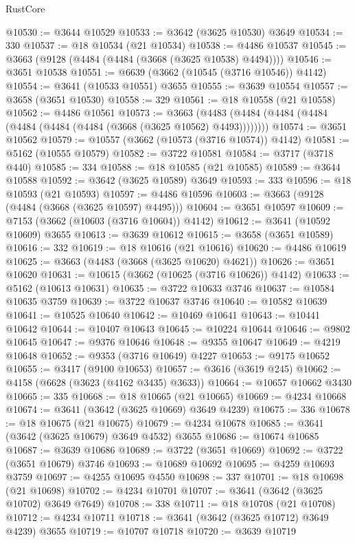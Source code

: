 \begin{lexlean}{RustCore}
\begin{coremodule}
@10530 := @3644 @10529
@10533 := @3642 (@3625 @10530) @3649
@10534 := 330
@10537 := @18 @10534 (@21 @10534)
@10538 := @4486 @10537
@10545 := @3663 (@9128 (@4484 (@4484 (@3668 (@3625 @10538) @4494))))
@10546 := @3651 @10538
@10551 := @6639 (@3662 (@10545 (@3716 @10546)) @4142)
@10554 := @3641 (@10533 @10551) @3655
@10555 := @3639 @10554
@10557 := @3658 (@3651 @10530)
@10558 := 329
@10561 := @18 @10558 (@21 @10558)
@10562 := @4486 @10561
@10573 := @3663 (@4483 (@4484 (@4484 (@4484 (@4484 (@4484 (@4484 (@3668 (@3625 @10562) @4493))))))))
@10574 := @3651 @10562
@10579 := @10557 (@3662 (@10573 (@3716 @10574)) @4142)
@10581 := @5162 (@10555 @10579)
@10582 := @3722 @10581
@10584 := @3717 (@3718 @440)
@10585 := 334
@10588 := @18 @10585 (@21 @10585)
@10589 := @3644 @10588
@10592 := @3642 (@3625 @10589) @3649
@10593 := 333
@10596 := @18 @10593 (@21 @10593)
@10597 := @4486 @10596
@10603 := @3663 (@9128 (@4484 (@3668 (@3625 @10597) @4495)))
@10604 := @3651 @10597
@10609 := @7153 (@3662 (@10603 (@3716 @10604)) @4142)
@10612 := @3641 (@10592 @10609) @3655
@10613 := @3639 @10612
@10615 := @3658 (@3651 @10589)
@10616 := 332
@10619 := @18 @10616 (@21 @10616)
@10620 := @4486 @10619
@10625 := @3663 (@4483 (@3668 (@3625 @10620) @4621))
@10626 := @3651 @10620
@10631 := @10615 (@3662 (@10625 (@3716 @10626)) @4142)
@10633 := @5162 (@10613 @10631)
@10635 := @3722 @10633 @3746
@10637 := @10584 @10635 @3759
@10639 := @3722 @10637 @3746
@10640 := @10582 @10639
@10641 := @10525 @10640
@10642 := @10469 @10641
@10643 := @10441 @10642
@10644 := @10407 @10643
@10645 := @10224 @10644
@10646 := @9802 @10645
@10647 := @9376 @10646
@10648 := @9355 @10647
@10649 := @4219 @10648
@10652 := @9353 (@3716 @10649) @4227
@10653 := @9175 @10652
@10655 := @3417 (@9100 @10653)
@10657 := @3616 (@3619 @245)
@10662 := @4158 (@6628 (@3623 (@4162 @3435) @3633))
@10664 := @10657 @10662 @3430
@10665 := 335
@10668 := @18 @10665 (@21 @10665)
@10669 := @4234 @10668
@10674 := @3641 (@3642 (@3625 @10669) @3649 @4239)
@10675 := 336
@10678 := @18 @10675 (@21 @10675)
@10679 := @4234 @10678
@10685 := @3641 (@3642 (@3625 @10679) @3649 @4532) @3655
@10686 := @10674 @10685
@10687 := @3639 @10686
@10689 := @3722 (@3651 @10669)
@10692 := @3722 (@3651 @10679) @3746
@10693 := @10689 @10692
@10695 := @4259 @10693 @3759
@10697 := @4255 @10695 @4550
@10698 := 337
@10701 := @18 @10698 (@21 @10698)
@10702 := @4234 @10701
@10707 := @3641 (@3642 (@3625 @10702) @3649 @7649)
@10708 := 338
@10711 := @18 @10708 (@21 @10708)
@10712 := @4234 @10711
@10718 := @3641 (@3642 (@3625 @10712) @3649 @4239) @3655
@10719 := @10707 @10718
@10720 := @3639 @10719

\end{coremodule}
\end{lexlean}
